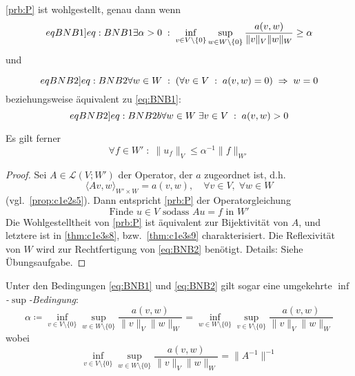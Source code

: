 \documentclass[../skript.tex]{subfiles}
\begin{document}
\begin{theorem} \label{thm:c1e4s2} %
	{
	\addtocounter{equation}{-1}
	\def\theequation{BNB 1}
	\cref{prb:P} ist wohlgestellt, genau dann wenn
	\begin{equation} %
	\label[eqBNB1]{eq:BNB1}
		\exists\alpha > 0 \; : \; \inf_{v\in V\setminus\{0\}} \sup_{w\in W\setminus\{0\}} \frac{a(v,w)}{\| v \|_V \| w \|_W} \geq\alpha
	\end{equation}
	und
	\addtocounter{equation}{-2}
	\def\theequation{BNB 2}
	\begin{equation} %
	\label[eqBNB2]{eq:BNB2}
		\forall w\in W \; : \; \left(\forall v\in V \; : \; a(v,w) = 0\right)\;\Rightarrow\;w=0
	\end{equation}
	beziehungsweise äquivalent zu \cref{eq:BNB1}:
	\begin{equation} %
	\label[eqBNB2]{eq:BNB2b}
		\forall w\in W \; \exists v\in V \; :\; a(v,w) > 0
	\end{equation}
	}
	Es gilt ferner
	\[
		\forall f\in W' \; :\; \| u_f \|_V \leq\alpha^{-1}\| f \|_{W'}
	\]
\end{theorem}

\begin{proof}
	Sei $A\in\mathcal{L}(V;W')$ der Operator, der $a$ zugeordnet ist, d.h.
	\[
		\langle Av, w \rangle_{W'\times W} = a(v,w),\quad\forall v\in V, \; \forall w\in W
	\]
	(vgl.\ \cref{prop:c1e2s5}). Dann entspricht \cref{prb:P} der Operatorgleichung
	\[
		\text{Finde }u\in V\text{ sodass } Au = f\text{ in } W'
	\]
	Die Wohlgestelltheit von \cref{prb:P} ist äquivalent zur Bijektivität von $A$, und letztere ist in \cref{thm:c1e3s8}, bzw.\ \cref{thm:c1e3s9} charakterisiert. Die Reflexivität von $W$ wird zur Rechtfertigung von \cref{eq:BNB2} benötigt. Details: Siehe Übungsaufgabe.
\end{proof}

\begin{remark} %
\label{bem:c1e4s3}
	Unter den Bedingungen \cref{eq:BNB1} und \cref{eq:BNB2} gilt sogar eine umgekehrte \emph{$\inf$-$\sup$-Bedingung}:
	\[
		\alpha \coloneqq \inf_{v\in V\setminus\{0\}}\sup_{w\in W\setminus\{0\}}\frac{a(v,w)}{\| v \|_V \| w \|_W} = \inf_{w\in W\setminus\{0\}}\sup_{v\in V\setminus\{0\}}\frac{a(v,w)}{\| v \|_V \| w \|_W}
	\]
	wobei 
	\[
		\inf_{v\in V\setminus\{0\}}\sup_{w\in W\setminus\{0\}}\frac{a(v,w)}{\| v \|_V \| w \|_W} = \| A^{-1} \| ^{-1}
	\]
\end{remark}
\end{document}

